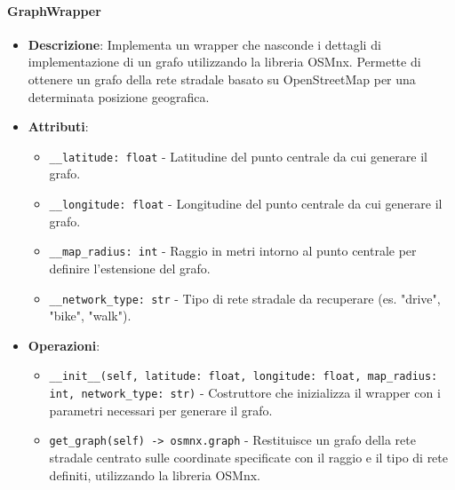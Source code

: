 \documentclass[10pt]{article}
\begin{document}
    \paragraph{GraphWrapper}
    \begin{itemize} 
    \item \textbf{Descrizione}: Implementa un wrapper che nasconde i dettagli di implementazione di un grafo utilizzando la libreria OSMnx. Permette di ottenere un grafo della rete stradale basato su OpenStreetMap per una determinata posizione geografica.
    \item \textbf{Attributi}:
    \begin{itemize}
        \item \texttt{\_\_latitude: float} - Latitudine del punto centrale da cui generare il grafo.
        \item \texttt{\_\_longitude: float} - Longitudine del punto centrale da cui generare il grafo.
        \item \texttt{\_\_map\_radius: int} - Raggio in metri intorno al punto centrale per definire l'estensione del grafo.
        \item \texttt{\_\_network\_type: str} - Tipo di rete stradale da recuperare (es. "drive", "bike", "walk").
    \end{itemize}
    
    \item \textbf{Operazioni}:
    \begin{itemize}
        \item \texttt{\_\_init\_\_(self, latitude: float, longitude: float, map\_radius: int, network\_type: str)} - Costruttore che inizializza il wrapper con i parametri necessari per generare il grafo.
        
        \item \texttt{get\_graph(self) -> osmnx.graph} - Restituisce un grafo della rete stradale centrato sulle coordinate specificate con il raggio e il tipo di rete definiti, utilizzando la libreria OSMnx.
    \end{itemize}
    \end{itemize}
\end{document}
